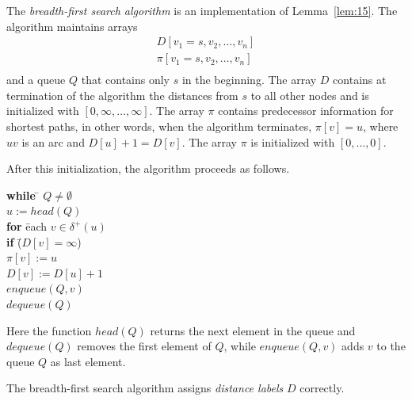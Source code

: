 The  \emph{breadth-first search algorithm} is an implementation of
Lemma~\ref{lem:15}. 
The algorithm maintains arrays 
\begin{displaymath}
  \begin{array}{c}
    D[v_1=s,v_2,\ldots,v_n]\\
    \pi[v_1=s,v_2,\ldots,v_n]\\
  \end{array}
\end{displaymath}
and a queue $Q$ that contains only $s$ in the beginning. The array
$D$ contains at termination of the algorithm the distances from $s$ to
all other nodes and is initialized with $[0,\infty,\ldots,\infty]$.  
The array $\pi$ contains predecessor information for
shortest paths, in other words, when the algorithm terminates, $\pi[v]
= u$, where $uv$ is an arc and $D[u]+1 = D[v]$. The array $\pi$ is
initialized with $[0,\ldots,0]$.


After this initialization, the algorithm proceeds as follows. 

\begin{tabbing}
  {\bf while} \= $Q \neq \emptyset$  \\
              \> $u := head(Q)$ \\
              \> {\bf for} \= each $v \in \delta^+(u)$ \\
              \>           \> {\bf if} \= ($D[v]=\infty$) \\
              \>           \>          \> $\pi[v]:=u$ \\ 
              \>           \>          \> $D[v]:=D[u]+1$ \\
              \>           \>          \> $enqueue(Q,v)$ \\
              \> $dequeue(Q)$ 
\end{tabbing}

Here the function $head(Q)$ returns the next element in the queue and
$dequeue(Q)$ removes the first element of $Q$, while $enqueue(Q,v)$
adds $v$ to the queue $Q$ as last element.



\begin{lemma}
  \label{lem:17}
  The breadth-first search algorithm assigns \emph{distance labels} $D$
  correctly. 
\end{lemma}



